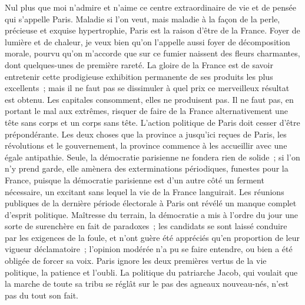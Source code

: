\documentclass[french,twoside]{book} %
\begin{document}
Nul plus que moi n’admire et n’aime ce centre extraordinaire de vie et de pensée qui s’appelle Paris. Maladie si l’on veut, mais maladie à la façon de la perle, précieuse et exquise hypertrophie, Paris est la raison d’être de la France. Foyer de lumière et de chaleur, je veux bien qu’on l’appelle aussi foyer de décomposition morale, pourvu qu’on m’accorde que sur ce fumier naissent des fleurs charmantes, dont quelques-unes de première rareté. La gloire de la France est de savoir entretenir cette prodigieuse exhibition permanente de ses produits les plus excellents ; mais il ne faut pas se dissimuler à quel prix ce merveilleux résultat est obtenu. Les capitales consomment, elles ne produisent pas. Il ne faut pas, en portant le mal aux extrêmes, risquer de faire de la France alternativement une tête sans corps et un corps sans tête. L’action politique de Paris doit cesser d’être prépondérante. Les deux choses que la province a jusqu’ici reçues de Paris, les révolutions et le gouvernement, la province commence à les accueillir avec une égale antipathie. Seule, la démocratie parisienne ne fondera rien de solide ; si l’on n’y prend garde, elle amènera des exterminations périodiques, funestes pour la France, puisque la démocratie parisienne est d’un autre côté un ferment nécessaire, un excitant sans lequel la vie de la France languirait. Les réunions publiques de la dernière période électorale à Paris ont révélé un manque complet d’esprit politique. Maîtresse du terrain, la démocratie a mis à l’ordre du jour une sorte de surenchère en fait de paradoxes ; les candidats se sont laissé conduire par les exigences de la foule, et n’ont guère été appréciés qu’en proportion de leur vigueur déclamatoire ; l’opinion modérée n’a pu se faire entendre, ou bien a été obligée de forcer sa voix. Paris ignore les deux premières vertus de la vie politique, la patience et l’oubli. La politique du patriarche Jacob, qui voulait que la marche de toute sa tribu se réglât sur le pas des agneaux nouveau-nés, n’est pas du tout son fait.\par
\end{document}
